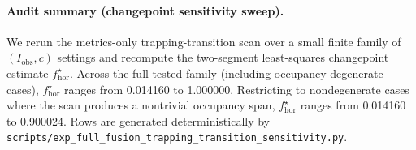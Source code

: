 \paragraph{Audit summary (changepoint sensitivity sweep).} \AuditTag We rerun the metrics-only trapping-transition scan over a small finite family of $(I_{\mathrm{obs}},c)$ settings and recompute the two-segment least-squares changepoint estimate $f_{\mathrm{hor}}^\star$. Across the full tested family (including occupancy-degenerate cases), $f_{\mathrm{hor}}^\star$ ranges from 0.014160 to 1.000000. Restricting to nondegenerate cases where the scan produces a nontrivial occupancy span, $f_{\mathrm{hor}}^\star$ ranges from 0.014160 to 0.900024. Rows are generated deterministically by \texttt{scripts/exp\_full\_fusion\_trapping\_transition\_sensitivity.py}.